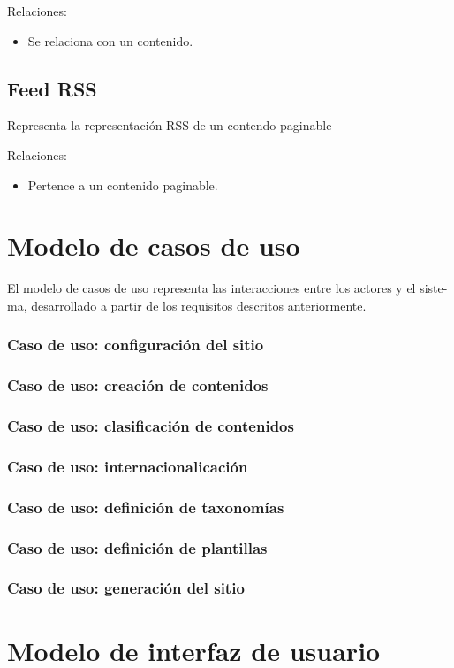 Relaciones:
\begin{itemize}
    \item Se relaciona con un contenido.
\end{itemize}

\subsection{Feed RSS}

Representa la representación RSS de un contendo paginable

Relaciones:
\begin{itemize}
    \item Pertence a un contenido paginable.
\end{itemize}


\section{Modelo de casos de uso}

El modelo de casos de uso representa las interacciones entre los actores y el siste-
ma, desarrollado a partir de los requisitos descritos anteriormente.

\subsubsection{Caso de uso: configuración del sitio}

\subsubsection{Caso de uso: creación de contenidos}

\subsubsection{Caso de uso: clasificación de contenidos}

\subsubsection{Caso de uso: internacionalicación}

\subsubsection{Caso de uso: definición de taxonomías}

\subsubsection{Caso de uso: definición de plantillas}

\subsubsection{Caso de uso: generación del sitio}



\section{Modelo de interfaz de usuario}

